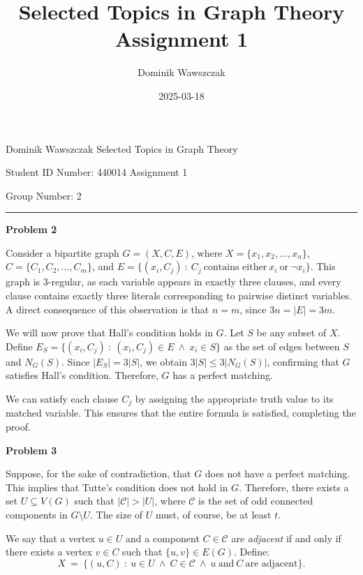 \documentclass[12pt]{article}
\title{Selected Topics in Graph Theory Assignment 1}
\author{Dominik Wawszczak}
\date{2025-03-18}
\begin{document}
	\setlength{\parindent}{0 cm}
	
	Dominik Wawszczak \hfill Selected Topics in Graph Theory
	
	Student ID Number: 440014 \hfill Assignment 1
	
	Group Number: 2
	
	\bigskip
	\hrule
	\bigskip
	
	\textbf{Problem 2}
	
	\medskip
	
	Consider a bipartite graph \(G = (X, C, E)\), where \(X = \{x_{1}, x_{2},
	\ldots, x_{n}\}\), \(C = \{C_{1}, C_{2}, \ldots, C_{m}\}\), and \(E =
	\{(x_{i}, C_{j}) \ : \ C_{j} \ \text{contains either} \ x_{i} \ \text{or} \
	\neg x_{i}\}\). This graph is \(3\)-regular, as each variable appears in
	exactly three clauses, and every clause contains exactly three literals
	corresponding to pairwise distinct variables. A direct consequence of this
	observation is that \(n = m\), since \(3n = |E| = 3m\).
	
	\medskip
	
	We will now prove that Hall’s condition holds in \(G\). Let \(S\) be any
	subset of \(X\). Define \(E_{S} = \{(x_{i}, C_{j}) \ : \ (x_{i}, C_{j}) \in
	E \ \wedge \ x_{i} \in S\}\) as the set of edges between \(S\) and
	\(N_{G}(S)\). Since \(|E_{S}| = 3 |S|\), we obtain \(3 |S| \leqslant 3
	|N_{G}(S)|\), confirming that \(G\) satisfies Hall’s condition. Therefore,
	\(G\) has a perfect matching.
	
	\medskip
	
	We can satisfy each clause \(C_{j}\) by assigning the appropriate truth
	value to its matched variable. This ensures that the entire formula is
	satisfied, completing the proof.
	
	\bigskip
	
	\textbf{Problem 3}
	
	\medskip
	
	Suppose, for the sake of contradiction, that \(G\) does not have a perfect
	matching. This implies that Tutte's condition does not hold in \(G\).
	Therefore, there exists a set \(U \subseteq V(G)\) such that \(|\mathcal{C}|
	> |U|\), where \(\mathcal{C}\) is the set of odd connected components in \(G
	\setminus U\). The size of \(U\) must, of course, be at least \(t\).
	
	\medskip
	
	We say that a vertex \(u \in U\) and a component \(C \in \mathcal{C}\) are
	\textit{adjacent} if and only if there exists a vertex \(v \in C\) such that
	\(\{u, v\} \in E(G)\). Define:
	\[ X \ = \ \{(u, C) \ : \ u \in U \ \wedge \ C \in \mathcal{C} \ \wedge \ u
	\ \text{and} \ C \ \text{are adjacent}\} \text{.} \]
	
\end{document}
